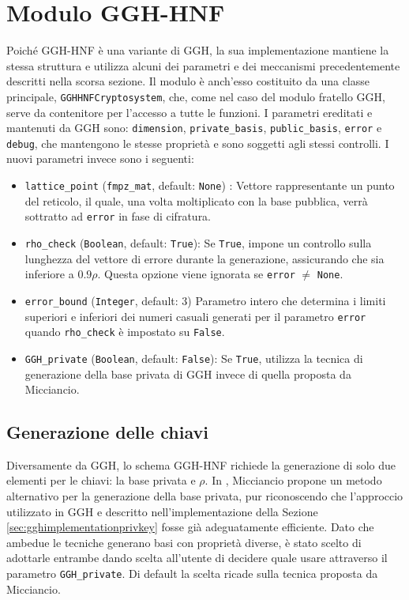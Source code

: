 \section{Modulo GGH-HNF}
\label{sec:moduloggh-hnf}

Poiché GGH-HNF è una variante di GGH, la sua implementazione mantiene la stessa struttura 
e utilizza alcuni dei parametri e dei meccanismi precedentemente descritti nella scorsa sezione.
Il modulo è anch'esso costituito da una classe principale, \texttt{GGHHNFCryptosystem}, che, come nel 
caso del modulo fratello GGH, serve da contenitore per l'accesso a tutte le funzioni.
I parametri ereditati e mantenuti da GGH sono: \texttt{dimension}, \texttt{private\_basis},
\texttt{public\_basis}, \texttt{error} e \texttt{debug}, che mantengono le stesse proprietà
e sono soggetti agli stessi controlli. I nuovi parametri invece sono i seguenti:
\begin{itemize}
    \item \texttt{lattice\_point} (\texttt{fmpz\_mat}, default: \texttt{None}) : 
    Vettore rappresentante un punto del reticolo, il quale, una volta moltiplicato con la
    base pubblica, verrà sottratto ad \texttt{error} in fase di cifratura.
    \item \texttt{rho\_check} (\texttt{Boolean}, default: \texttt{True}):
    Se \texttt{True}, impone un controllo sulla lunghezza del vettore di errore durante 
    la generazione, assicurando che sia inferiore a $0.9\rho$. Questa opzione viene 
    ignorata se \texttt{error} $\neq$ \texttt{None}.
    \item \texttt{error\_bound} (\texttt{Integer}, default: 3)
    Parametro intero che determina i limiti superiori e inferiori dei numeri casuali 
    generati per il parametro \texttt{error} quando \texttt{rho\_check} è impostato su 
    \texttt{False}. 
    \item \texttt{GGH\_private} (\texttt{Boolean}, default: \texttt{False}):
    Se \texttt{True}, utilizza la tecnica di generazione della base privata di GGH invece di 
    quella proposta da Micciancio. 
\end{itemize}

\subsection{Generazione delle chiavi}

Diversamente da GGH, lo schema GGH-HNF richiede la generazione di solo due elementi 
per le chiavi: la base privata e $\rho$. In \cite{HNF01}, Micciancio propone un metodo 
alternativo per la generazione della base privata, pur riconoscendo che l'approccio 
utilizzato in GGH e descritto nell'implementazione della Sezione \ref{sec:gghimplementationprivkey} 
fosse già adeguatamente efficiente. Dato che ambedue le tecniche generano basi con 
proprietà diverse, è stato scelto di adottarle entrambe dando scelta all'utente di decidere
quale usare attraverso il parametro \texttt{GGH\_private}. Di default la scelta ricade
sulla tecnica proposta da Micciancio. 

